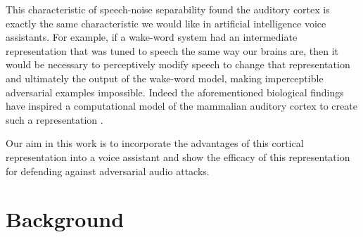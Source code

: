 \documentclass{article}
\begin{document}
This characteristic of speech-noise separability found the auditory cortex is exactly the same characteristic we would like in artificial intelligence voice assistants.
For example, if a wake-word system had an intermediate representation that was tuned to speech the same way our brains are, then it would be necessary to perceptively modify speech to change that representation and ultimately the output of the wake-word model, making imperceptible adversarial examples impossible.
Indeed the aforementioned biological findings have inspired a computational model of the mammalian auditory cortex to create such a representation \cite{chi_2005,nsl_doc}.

Our aim in this work is to incorporate the advantages of this cortical representation into a voice assistant and show the efficacy of this representation for defending against adversarial audio attacks.
%
%
%
%
\section{Background}
\end{document}
